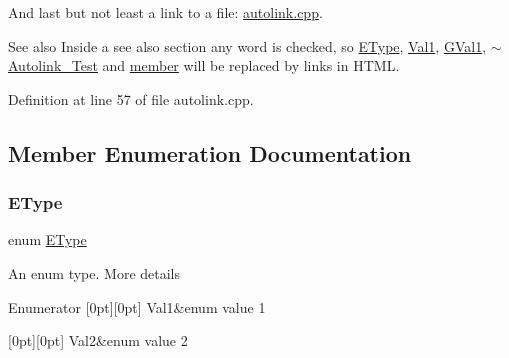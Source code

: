 And last but not least a link to a file\+: \hyperlink{autolink_8cpp}{autolink.\+cpp}.

\begin{DoxySeeAlso}{See also}
Inside a see also section any word is checked, so \hyperlink{class_autolink___test_ad5d0e87f61ba99c47a539492df7917a1}{E\+Type}, \hyperlink{class_autolink___test_ad5d0e87f61ba99c47a539492df7917a1a06bb6ba8ccdce459e14c7a917b07f6e4}{Val1}, \hyperlink{autolink_8cpp_a656d63cf384d2a6f23c2c18523a7bc5ea0f016f49e4f3bcd072319b9d68bc927d}{G\+Val1}, \hyperlink{class_autolink___test_a53069f9df63c2d47097eb12ea14796f5}{$\sim$\+Autolink\+\_\+\+Test} and \hyperlink{class_autolink___test_a3b57d2ff9a1488b8e434478eb77e7846}{member} will be replaced by links in H\+T\+ML. 
\end{DoxySeeAlso}


Definition at line 57 of file autolink.\+cpp.



\subsection{Member Enumeration Documentation}
\mbox{\label{class_autolink___test_ad5d0e87f61ba99c47a539492df7917a1}} 
\subsubsection{\texorpdfstring{E\+Type}{EType}}
{\footnotesize\ttfamily enum \hyperlink{class_autolink___test_ad5d0e87f61ba99c47a539492df7917a1}{E\+Type}}

An enum type. More details \begin{DoxyEnumFields}{Enumerator}
[0pt][0pt]{}\mbox{\label{class_autolink___test_ad5d0e87f61ba99c47a539492df7917a1a06bb6ba8ccdce459e14c7a917b07f6e4}} 
Val1&enum value 1 \\
\hline

[0pt][0pt]{}\mbox{\label{class_autolink___test_ad5d0e87f61ba99c47a539492df7917a1a470f89a037b58ee4ce04efe02907b410}} 
Val2&enum value 2 \\
\hline

\end{DoxyEnumFields}


